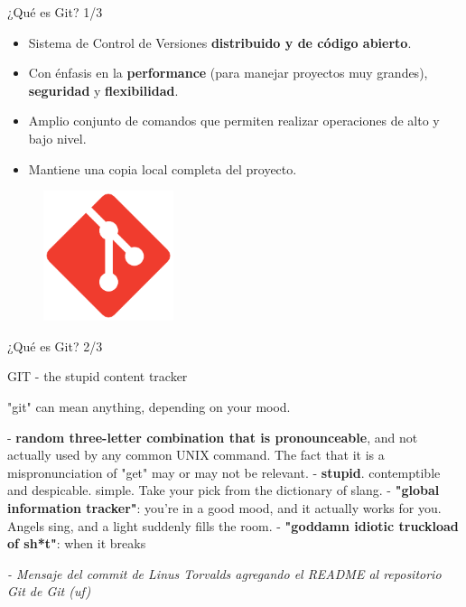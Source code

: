 \begin{frame}{¿Qué es Git? 1/3}

	\begin{block}{}
 \begin{itemize}
     	\item Sistema de Control de Versiones \textbf{distribuido y de código abierto}.
  
        \item Con énfasis en la \textbf{performance} (para manejar proyectos muy grandes), \textbf{seguridad} y \textbf{flexibilidad}.
        
        \item Amplio conjunto de comandos que permiten realizar operaciones de alto y bajo nivel.

        \item Mantiene una copia local completa del proyecto.
 \end{itemize}

	\end{block}

    \begin{figure}[ht]
        \begin{center}
            \includegraphics[height=1.5in]{images/logo-git.pdf}
        \end{center}
    \end{figure}
\end{frame}

\begin{frame}{¿Qué es Git? 2/3}
    \begin{center}
        \begin{block}{GIT - the stupid content tracker}

            "git" can mean anything, depending on your mood.
            
             - \textbf{random three-letter combination that is pronounceable}, and not actually used by any common UNIX command.  The fact that it is a mispronunciation of "get" may or may not be relevant.\newline
             - \textbf{stupid}. contemptible and despicable. simple. Take your pick from the dictionary of slang.\newline
             - \textbf{"global information tracker"}: you're in a good mood, and it actually works for you. Angels sing, and a light suddenly fills the room. \newline
             - \textbf{"goddamn idiotic truckload of sh*t"}: when it breaks
        \end{block}
    \end{center}
    \pause
    \textit{ - Mensaje del commit de Linus Torvalds agregando el README al repositorio Git de Git (uf)}
    
\end{frame}


